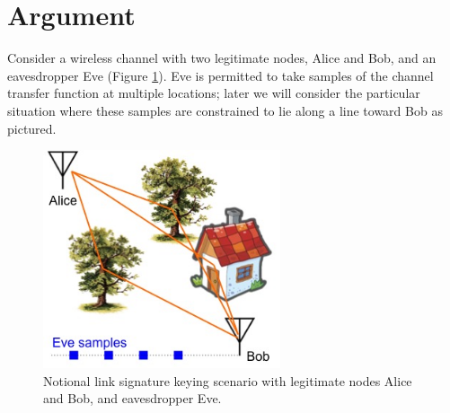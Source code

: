 \documentclass[journal]{IEEEtran}
\begin{document}
\section{Argument}
Consider a wireless channel with two legitimate nodes, Alice and Bob, and an eavesdropper Eve (Figure \ref{scenario}).  Eve is permitted to take samples of the channel transfer function at multiple locations; later we will consider the particular situation where these samples are constrained to lie along a line toward Bob as pictured.
\begin{figure}
\begin{center}
\includegraphics[width=2.75in]{scenarioEve}
\caption{Notional link signature keying scenario with legitimate nodes Alice and Bob, and eavesdropper Eve.}\label{scenario}
\end{center}
\end{figure}
\end{document}
